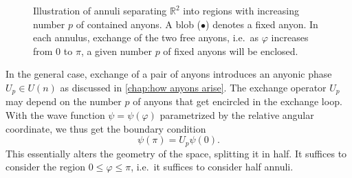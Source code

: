 \documentclass[a4paper,10pt,oneside]{book}
\theoremstyle{plain}
\theoremstyle{definition}
\theoremstyle{remark}
\begin{document}
\begin{figure}[h]
  \centering
  \caption{Illustration of annuli separating $\mathbb{R}^2$ into regions with increasing number $p$ of contained anyons. A blob ($\bullet$) denotes a fixed anyon. In each annulus, exchange of the two free anyons, i.e.\ as $\varphi$ increases from $0$ to $\pi$, a given number $p$ of fixed anyons will be enclosed.}
  \label{fig:annuli}
\end{figure}

In the general case, exchange of a pair of anyons introduces an anyonic phase $U_p \in U(n)$ as discussed in \cref{chap:how anyons arise}. The exchange operator $U_p$ may depend on the number $p$ of anyons that get encircled in the exchange loop. With the wave function $\psi = \psi(\varphi)$ parametrized by the relative angular coordinate, we thus get the boundary condition
\begin{equation}\label{U_p boundary condition}
  \psi(π) = U_p \psi(0).
\end{equation}
This essentially alters the geometry of the space, splitting it in half. It suffices to consider the region $0 \le \varphi \le π$, i.e.\ it suffices to consider half annuli.
\end{document}
